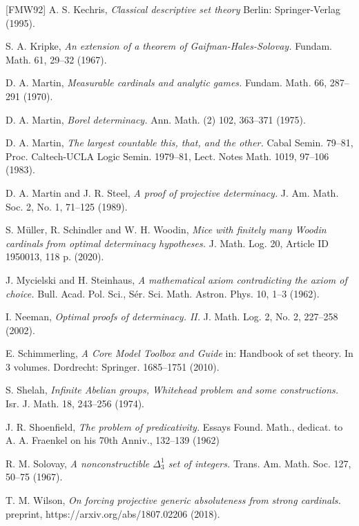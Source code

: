 \documentclass[10pt]{amsart}
\theoremstyle{definition}
\begin{document}
\begin{thebibliography}{[FMW92]}
 A. S. Kechris,
\emph{Classical descriptive set theory}
Berlin: Springer-Verlag (1995).

 S. A. Kripke,
\emph{An extension of a theorem of Gaifman-Hales-Solovay.}
Fundam. Math. 61, 29--32 (1967).


 D. A. Martin,
\emph{Measurable cardinals and analytic games.}
Fundam. Math. 66, 287--291 (1970).

 D. A. Martin,
\emph{Borel determinacy.}
Ann. Math. (2) 102, 363--371 (1975).

 D. A. Martin,
\emph{The largest countable this, that, and the other. }
Cabal Semin. 79--81, Proc. Caltech-UCLA Logic Semin. 1979--81, Lect. Notes Math. 1019, 97--106 (1983).

 D. A. Martin and J. R. Steel,
\emph{A proof of projective determinacy.}
J. Am. Math. Soc. 2, No. 1, 71--125 (1989).


 S. Müller, R. Schindler and W. H. Woodin,
\emph{Mice with finitely many Woodin cardinals from optimal determinacy hypotheses.}
J. Math. Log. 20, Article ID 1950013, 118 p. (2020).

 J. Mycielski and H. Steinhaus,
\emph{A mathematical axiom contradicting the axiom of choice.}
Bull. Acad. Pol. Sci., Sér. Sci. Math. Astron. Phys. 10, 1--3 (1962).

 I. Neeman,
\emph{Optimal proofs of determinacy. II.}
J. Math. Log. 2, No. 2, 227--258 (2002).


 E. Schimmerling,
\emph{A Core Model Toolbox and Guide}
in: Handbook of set theory. In 3 volumes. Dordrecht: Springer. 1685--1751 (2010).

 S. Shelah,
\emph{Infinite Abelian groups, Whitehead problem and some constructions.}
Isr. J. Math. 18, 243--256 (1974).

 J. R. Shoenfield,
\emph{The problem of predicativity.}
Essays Found. Math., dedicat. to A. A. Fraenkel on his 70th Anniv., 132--139 (1962)

 R. M. Solovay, \emph{A nonconstructible $\Delta^1_3$ set of integers.}
Trans. Am. Math. Soc. 127, 50--75 (1967).

 T. M. Wilson,
\emph{On forcing projective generic absoluteness from strong cardinals.}
preprint, https://arxiv.org/abs/1807.02206 (2018).

\end{thebibliography}
\end{document}
